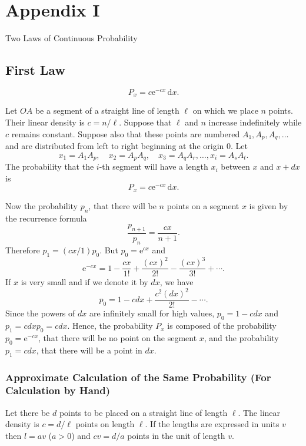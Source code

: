 \documentclass[letterpaper, 11pt]{article}
\begin{document}
\newpage
\section*{Appendix I} \label{sec:appendix}

\begin{center}
    \Large Two Laws of Continuous Probability
\end{center}

\subsection*{First Law}

\[P_x = c \mathrm{e}^{-cx} \, \mathrm{d}x.\]

Let \(OA\) be a segment of a straight line of length \(\ell\) on which we place \(n\) points. Their
linear density is \(c = n/\ell\). Suppose that \(\ell\) and \(n\) increase indefinitely while \(c\)
remains constant. Suppose also that these points are numbered \(A_1, A_p, A_q, \dots\) and are
distributed from left to right beginning at the origin \(0\). Let
\[x_1 = A_1 A_p, \quad x_2 = A_p A_q, \quad x_3 = A_q A_r, \dots, x_i = A_s A_t.\] The probability
that the \(i\)-th segment will have a length \(x_i\) between \(x\) and \(x + dx\) is
\[P_x = c\mathrm{e}^{-cx} \, \mathrm{d}x.\]

Now the probability \(p_n\), that there will be \(n\) points on a segment \(x\) is given by the
recurrence formula
\[\frac{p_{n+1}}{p_n} = \frac{cx}{n+1} .\] Therefore \(p_1 = (cx/1)p_0\). But \(p_0 =
\mathrm{e}^{cx}\) and
\[\mathrm{e}^{-cx} = 1 - \frac{cx}{1!} + \frac{(cx)^2}{2!} - \frac{(cx)^3}{3!} + \cdots .\] If \(x\)
is very small and if we denote it by \(dx\), we have
\[p_0 = 1 - c dx + \frac{c^2 (dx)^2}{2!} - \cdots .\] Since the powers of \(dx\) are infinitely
small for high values, \(p_0 = 1 - c dx\) and \(p_1 = c dx p_0 = c dx\). Hence, the probability
\(P_x\) is composed of the probability \(p_0 = \mathrm{e}^{-cx}\), that there will be no point on
the segment \(x\), and the probability \(p_1 = c dx\), that there will be a point in \(dx\).

\subsubsection*{Approximate Calculation of the Same Probability (For Calculation by Hand)}

Let there be \( d \) points to be placed on a straight line of length \( \ell \). The linear density
is \( c = d / \ell \) points on length \( \ell \). If the lengths are expressed in units \( v \)
then \( l = av \) (\( a > 0 \)) and \( cv = d / a \) points in the unit of length \( v \).
\end{document}
